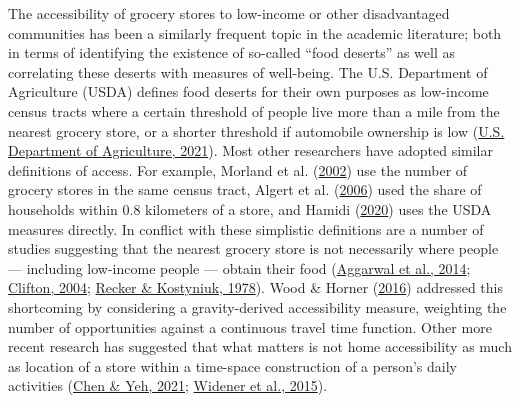 \documentclass[review, 3p]{elsarticle} %
\begin{document}
The accessibility of grocery stores to low-income or other disadvantaged
communities has been a similarly frequent topic in the academic literature;
both in terms of identifying the existence of so-called ``food deserts'' as well
as correlating these deserts with measures of well-being. The U.S. Department of
Agriculture (USDA) defines food deserts for their own purposes as low-income census tracts
where a certain threshold of people live more than a mile from the nearest
grocery store, or a shorter threshold if automobile ownership is low (\protect\hyperlink{ref-usdafara}{U.S. Department of Agriculture, 2021}).
Most other researchers have adopted similar definitions of access. For example,
Morland et al. (\protect\hyperlink{ref-morland2002}{2002}) use the number of grocery stores in the same census tract, Algert et al. (\protect\hyperlink{ref-algert2006}{2006})
used the share of households within 0.8 kilometers of a store, and Hamidi (\protect\hyperlink{ref-hamidi2020}{2020})
uses the USDA measures directly.
In conflict with these simplistic definitions are
a number of studies suggesting that the nearest grocery store is not necessarily
where people --- including low-income people --- obtain their food
(\protect\hyperlink{ref-aggarwal2014}{Aggarwal et al., 2014}; \protect\hyperlink{ref-clifton2004}{Clifton, 2004}; \protect\hyperlink{ref-recker1978}{Recker \& Kostyniuk, 1978}). Wood \& Horner (\protect\hyperlink{ref-wood2016}{2016}) addressed this shortcoming
by considering a gravity-derived accessibility measure, weighting the number of
opportunities against a continuous travel time function. Other more recent research
has suggested that what matters
is not home accessibility as much as location of a store within a time-space construction
of a person's daily activities (\protect\hyperlink{ref-chen2021effects}{Chen \& Yeh, 2021}; \protect\hyperlink{ref-widener2015spatiotemporal}{Widener et al., 2015}).
\end{document}
